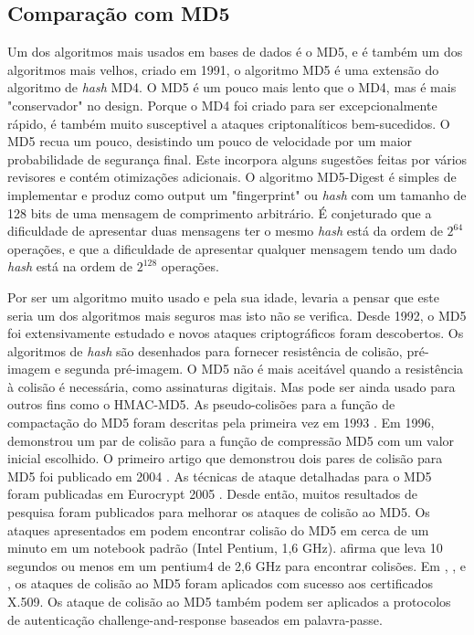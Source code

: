 \documentclass[conference]{IEEEtran}
\begin{document}
\subsection{Comparação com MD5}

Um dos algoritmos mais usados em bases de dados é o MD5, e é também um dos algoritmos mais velhos, 
criado em 1991, o algoritmo MD5 é uma extensão do algoritmo de \textit{hash} MD4. O MD5 é um pouco 
mais lento que o MD4, mas é mais "conservador" no design. Porque o MD4 foi criado para ser 
excepcionalmente rápido, é também muito susceptivel a ataques criptonalíticos bem-sucedidos. 
O MD5 recua um pouco, desistindo um pouco de velocidade por um maior probabilidade de segurança final. 
Este incorpora alguns sugestões feitas por vários revisores e contém otimizações adicionais. 
O algoritmo MD5-Digest é simples de implementar e produz como output um "fingerprint" ou \textit{hash} com um tamanho de 128 bits
de uma mensagem de comprimento arbitrário. É conjeturado que a dificuldade de apresentar duas mensagens 
ter o mesmo \textit{hash} está da ordem de $2^{64}$ operações, e que a dificuldade de apresentar qualquer mensagem 
tendo um dado \textit{hash} está na ordem de $2^{128}$ operações. \cite{rfc1321}

Por ser um algoritmo muito usado e pela sua idade, levaria a pensar que 
este seria um dos algoritmos mais seguros mas isto não se verifica.
Desde 1992, o MD5 foi extensivamente estudado e novos ataques criptográficos foram descobertos. 
Os algoritmos de \textit{hash} são desenhados para fornecer resistência de colisão, pré-imagem e segunda 
pré-imagem. O MD5 não é mais aceitável quando a resistência à colisão é necessária, 
como assinaturas digitais. Mas pode ser ainda usado para outros fins como o HMAC-MD5. 
As pseudo-colisões para a função de compactação do MD5 foram descritas pela primeira vez em 
1993 \cite{BoerCollisions}. Em 1996, \cite{DobbertinCryptanalysis} demonstrou um par de colisão 
para a função de compressão MD5 com um valor inicial escolhido. O primeiro artigo que demonstrou dois 
pares de colisão para MD5 foi publicado em 2004 \cite{Wang2004Collisions}. As técnicas de ataque detalhadas para o MD5 
foram publicadas em Eurocrypt 2005 \cite{WanginproceedingsHow}. Desde então, muitos resultados de pesquisa foram publicados 
para melhorar os ataques de colisão ao MD5. Os ataques apresentados em \cite{Klima2006Tunnels} podem encontrar 
colisão do MD5 em cerca de um minuto em um notebook padrão (Intel Pentium, 1,6 GHz). \cite{Stevens2007Collisions} 
afirma que leva 10 segundos ou menos em um pentium4 de 2,6 GHz para encontrar colisões. 
Em \cite{Stevens2007Collisions}, \cite{Stevens2007Chosen}, \cite{Stevens2009Short} e \cite{Stevens2012Chosen}, os ataques de colisão ao MD5 
foram aplicados com sucesso aos certificados X.509. Os ataque de colisão ao MD5 também podem ser 
aplicados a protocolos de autenticação challenge-and-response baseados em palavra-passe. \cite{rfc6151}
\end{document}
